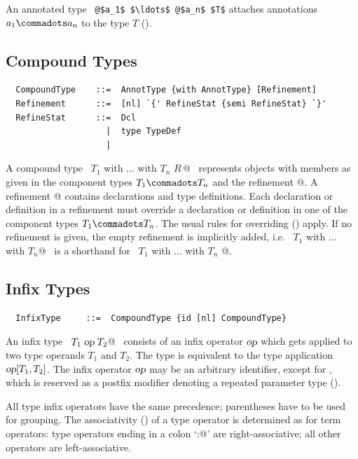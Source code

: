 An annotated type ~\lstinline^@$a_1$ $\ldots$ @$a_n$ $T$^
attaches annotations $a_1 \commadots a_n$ to the type $T$
().

\subsection{Compound Types}
\label{sec:compound-types}
\label{sec:refinements}

\syntax\begin{lstlisting}
  CompoundType    ::=  AnnotType {with AnnotType} [Refinement]
  Refinement      ::=  [nl] `{' RefineStat {semi RefineStat} `}'
  RefineStat      ::=  Dcl
                    |  type TypeDef
                    |
\end{lstlisting}

A compound type ~\lstinline@$T_1$ with $\ldots$ with $T_n$ {$R\,$}@~
represents objects with members as given in the component types $T_1
\commadots T_n$ and the refinement @. A refinement
@ contains declarations and type definitions. Each
declaration or definition in a refinement must override a declaration
or definition in one of the component types $T_1 \commadots T_n$. The
usual rules for overriding () apply. If no
refinement is given, the empty refinement is implicitly added,
i.e. ~\lstinline@$T_1$ with $\ldots$ with $T_n$@~ is a shorthand for
~\lstinline@$T_1$ with $\ldots$ with $T_n$ {}@.
 
\subsection{Infix Types}

\syntax\begin{lstlisting}
  InfixType     ::=  CompoundType {id [nl] CompoundType}
\end{lstlisting}
An infix type ~\lstinline@$T_1\;\mbox{\sl op}\;T_2$@~ consists of an infix
operator $\mbox{\sl op}$ which gets applied to two type operands $T_1$ and
$T_2$.  The type is equivalent to the type application $\mbox{\sl op}[T_1,
T_2]$.  The infix operator $\mbox{\sl op}$ may be an arbitrary identifier,
except for \code{*}, which is reserved as a postfix modifier 
denoting a repeated parameter type (). 

All type infix operators have the same precedence; parentheses have to
be used for grouping. The associativity ()
of a type operator is determined as for term operators: type operators
ending in a colon `\lstinline@:@' are right-associative; all other
operators are left-associative.


